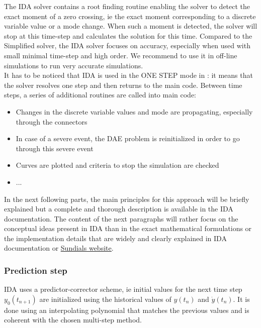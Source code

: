 \documentclass[a4paper, 12pt]{report}
\begin{document}
The \ac{IDA} solver contains a root finding routine enabling the solver to detect the exact moment of a zero crossing, ie the exact moment corresponding to a discrete variable value or a mode change. When such a moment is detected, the solver will stop at this time-step and calculates the solution for this time. Compared to the Simplified solver, the \ac{IDA} solver focuses on accuracy, especially when used with small minimal time-step and high order.
We recommend to use it in off-line simulations to run very accurate simulations. \\

It has to be noticed that \ac{IDA} is used in the ONE STEP mode in \Dynawo : it means that the solver resolves one step and then returns to the main \Dynawo code. Between time steps, a series of additional routines are called into \Dynawo main code:
\begin{itemize}
\item Changes in the discrete variable values and mode are propagating, especially through the connectors
\item In case of a severe event, the \ac{DAE} problem is reinitialized in order to go through this severe event
\item Curves are plotted and criteria to stop the simulation are checked
\item ...
\end{itemize}

In the next following parts, the main principles for this approach will be briefly explained but a complete and thorough description is available in the \ac{IDA} documentation. The content of the next paragraphs will rather focus on the conceptual ideas present in \ac{IDA} than in the exact mathematical formulations or the implementation details that are widely and clearly explained in \ac{IDA} documentation or  \href{https://computation.llnl.gov/projects/sundials}{\underline{Sundials website}}.

\subsubsection{Prediction step}

\ac{IDA} uses a predictor-corrector scheme, ie initial values for the next time step $y_0(t_{n+1})$ are initialized using the historical values of $y(t_n)$ and $\dot{y}(t_n)$. It is done using an interpolating polynomial that matches the previous values and is coherent with the chosen multi-step method. \\
\end{document}
